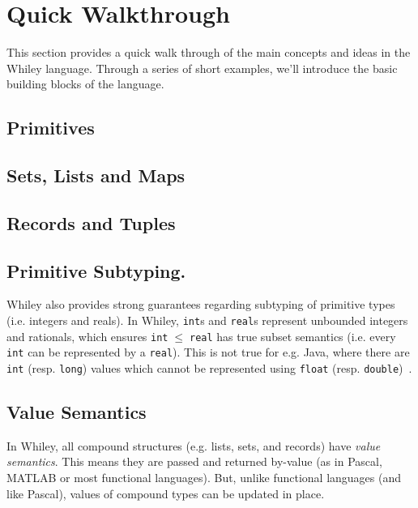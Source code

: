 \newpage
\section{Quick Walkthrough}
This section provides a quick walk through of the main concepts and
ideas in the Whiley language.  Through a series of short examples,
we'll introduce the basic building blocks of the language.

\subsection{Primitives}

\subsection{Sets, Lists and Maps}

\subsection{Records and Tuples}

\subsection{Primitive Subtyping.} 
Whiley also provides strong guarantees regarding subtyping of
primitive types (i.e. integers and reals).  In Whiley,
\lstinline{int}s and \lstinline{real}s represent unbounded integers
and rationals, which ensures \lstinline{int}$\;\le\;$\lstinline{real}
has true subset semantics (i.e. every \lstinline{int} can be
represented by a \lstinline{real}).  This is not true for e.g. Java,
where there are \lstinline{int} (resp. \lstinline{long}) values which
cannot be represented using \lstinline{float}
(resp. \lstinline{double})~\cite[\S5.1.2]{GJSB05}.

\subsection{Value Semantics}
\label{value_semantics}
In Whiley, all compound structures (e.g. lists, sets, and records)
have {\em value semantics}.  This means they are passed and returned
by-value (as in Pascal, MATLAB or most functional languages).  But, unlike
functional languages (and like Pascal), values of compound types can
be updated in place.

